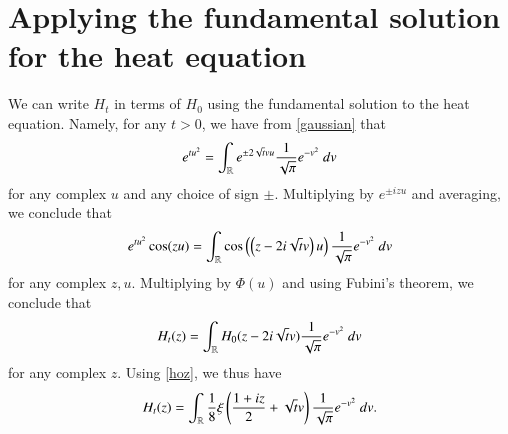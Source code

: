\section{Applying the fundamental solution for the heat equation}\label{heatflow-sec}

We can write $H_t$ in terms of $H_0$ using the fundamental solution to the heat equation.  Namely, for any $t>0$, we have from \eqref{gaussian} that
$$
e^{tu^2} = \int_{\mathbb{R}} e^{\pm 2 \sqrt{t} vu} \frac{1}{\sqrt{\pi}} e^{-v^2}\ dv$$
for any complex $u$ and any choice of sign $\pm$. Multiplying by $e^{\pm i zu}$ and averaging, we conclude that
$$
e^{tu^2} \cos(zu) = \int_{\mathbb{R}} \cos\left(\left(z - 2 i \sqrt{t} v\right)u\right) \frac{1}{\sqrt{\pi}} e^{-v^2}\ dv$$
for any complex $z,u$.  Multiplying by $\Phi(u)$ and using Fubini's theorem, we conclude that
$$ H_t(z) = \int_{\mathbb{R}} H_0( z - 2i \sqrt{t} v ) \frac{1}{\sqrt{\pi}} e^{-v^2}\ dv $$
for any complex $z$.  Using \eqref{hoz}, we thus have
\begin{equation}\label{htz}
 H_t(z) = \int_{\mathbb{R}} \frac{1}{8} \xi\left( \frac{1+iz}{2} + \sqrt{t} v \right) \frac{1}{\sqrt{\pi}} e^{-v^2}\ dv.
\end{equation}

